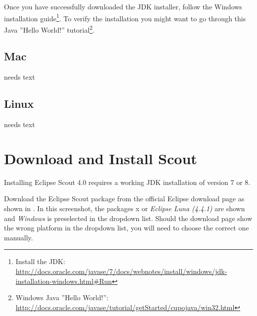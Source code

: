 \documentclass[a4paper,10pt,twoside]{book}
\begin{document}
Once you have successfully downloaded the JDK installer, follow the Windows installation guide\footnote{
Install the JDK: \url{http://docs.oracle.com/javase/7/docs/webnotes/install/windows/jdk-installation-windows.html\#Run}}.
To verify the installation you might want to go through this Java ''Hello World!'' 
tutorial\footnote{Windows Java ''Hello World!'': \url{http://docs.oracle.com/javase/tutorial/getStarted/cupojava/win32.html}}.

\subsection{Mac}
needs text

\subsection{Linux}
needs text

\section{Download and Install Scout}



Installing Eclipse Scout 4.0 requires a working JDK installation of version 7 or 8. 

Download the Eclipse Scout package from the official Eclipse download page as shown in  .
In this screenshot, the packages x	or \textit{Eclipse Luna (4.4.1)} are shown and \textit{Windows} is preselected in the dropdown list.
Should the download page show the wrong platform in the dropdown list, you will need to choose the correct one manually.
\end{document}
